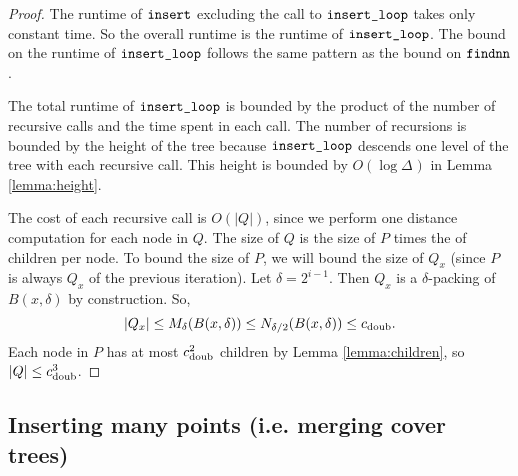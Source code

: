 \documentclass[../main.tex]{subfiles}
\newcommand{\aspect}[1]{\Delta_{#1}}
\newcommand{\cdoub}{c_\textnormal{doub}}
\newcommand{\mkprocedure}[1]{\textnormal{\ttfamily {#1}}}
\newcommand{\findnn}{\mkprocedure{findnn}}
\newcommand{\ctinsert}{\ensuremath{\textnormal{\ttfamily insert}}}
\newcommand{\ctinsertloop}{\ensuremath{\textnormal{\ttfamily insert\_loop}}}
\begin{document}
\begin{proof}
    The runtime of $\ctinsert$ excluding the call to $\ctinsertloop$ takes only constant time.
    So the overall runtime is the runtime of $\ctinsertloop$.
    The bound on the runtime of $\ctinsertloop$ follows the same pattern as the bound on $\findnn$.

    The total runtime of $\ctinsertloop$ is bounded by the product of the number of recursive calls and the time spent in each call.
    The number of recursions is bounded by the height of the tree because $\ctinsertloop$ descends one level of the tree with each recursive call. 
    This height is bounded by $O(\log\aspect{})$ in Lemma \ref{lemma:height}.

    The cost of each recursive call is $O(|Q|)$,
    since we perform one distance computation for each node in $Q$.
    The size of $Q$ is the size of $P$ times the of children per node.
    To bound the size of $P$, we will bound the size of $Q_x$ 
    (since $P$ is always $Q_x$ of the previous iteration).
    Let $\delta=2^{i-1}$.
    Then $Q_x$ is a $\delta$-packing of $B(x,\delta)$ by construction.
    So,
    \begin{equation}
        |Q_x| \le M_\delta(B(x,\delta)) \le N_{\delta/2}(B(x,\delta)) \le \cdoub.
    \end{equation}
    Each node in $P$ has at most $\cdoub^2$ children by Lemma \ref{lemma:children},
    so $|Q| \le \cdoub^3$.
\end{proof}


\subsection{Inserting many points (i.e. merging cover trees)}
\end{document}
